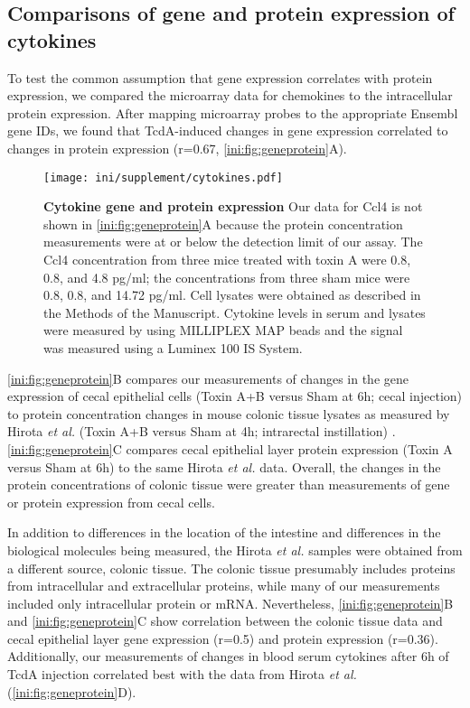 \subsection{Comparisons of gene and protein expression of cytokines}

To test the common assumption that gene expression correlates
with protein expression, we compared the microarray data for chemokines to the
intracellular protein expression. After mapping
microarray probes to the appropriate Ensembl gene IDs, we found that TcdA-induced 
changes in gene expression correlated to changes in protein 
expression (r=0.67, \autoref{ini:fig:geneprotein}A). 

\begin{figure}
\centering
\texttt{[image: ini/supplement/cytokines.pdf]}
\caption[Cytokine gene and protein expression]
         {\textbf{Cytokine gene and protein expression}
         Our data for Ccl4 is not shown
in \autoref{ini:fig:geneprotein}A because the protein concentration measurements
were at or below the detection limit of our assay. The Ccl4 concentration from
three mice treated with toxin A were 0.8, 0.8, and 4.8 pg/ml; the concentrations
from three sham mice were 0.8, 0.8, and 14.72 pg/ml. Cell 
lysates were obtained as described in the Methods of the Manuscript.
Cytokine levels in serum and lysates were measured by using
MILLIPLEX\textsuperscript{\textregistered{}}
MAP beads and the signal was measured using a Luminex 100 IS System.}
\label{ini:fig:geneprotein}
\end{figure}

\autoref{ini:fig:geneprotein}B compares our measurements of changes in the gene expression 
of cecal epithelial cells (Toxin A+B versus Sham at 6h; cecal injection) 
to protein concentration changes 
in mouse colonic tissue lysates as measured by
Hirota \emph{et al.} (Toxin A+B versus Sham at 4h; intrarectal instillation) \cite{Hirota:2012gx}. 
\autoref{ini:fig:geneprotein}C compares cecal epithelial layer protein expression (Toxin A
versus Sham at 6h) to the same Hirota \emph{et al.} data.
Overall, the changes in the protein concentrations of colonic tissue were greater
than measurements of gene or protein expression from cecal cells. 

In addition to differences in the location of the intestine and 
differences in the biological molecules being measured, the 
Hirota \emph{et al.} samples were obtained from a different source, colonic tissue.
The colonic tissue presumably includes proteins from
intracellular and extracellular proteins, while many of our measurements included
only intracellular protein or mRNA. Nevertheless, \autoref{ini:fig:geneprotein}B
and \autoref{ini:fig:geneprotein}C show correlation between the colonic tissue
data and cecal epithelial layer gene expression (r=0.5) and protein
expression (r=0.36). Additionally, our measurements of changes in blood serum
cytokines after 6h of TcdA injection correlated best with the data from 
Hirota \emph{et al.} (\autoref{ini:fig:geneprotein}D).

